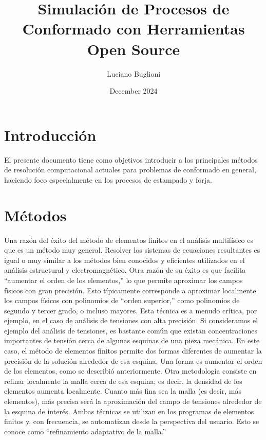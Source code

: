 \documentclass{article}
\title{Simulación de Procesos de Conformado con Herramientas Open Source}
\author{Luciano Buglioni}
\date{December 2024}
\begin{document}
\maketitle
\tableofcontents
\newpage
\section{Introducción}
El presente documento tiene como objetivos introducir a los principales métodos de resolución computacional actuales para problemas de conformado en general, haciendo foco especialmente en los procesos de estampado y forja.




\section{Métodos}

Una razón del éxito del método de elementos finitos en el análisis multifísico es que es un método muy general. Resolver los sistemas de ecuaciones resultantes es igual o muy similar a los métodos bien conocidos y eficientes utilizados en el análisis estructural y electromagnético. Otra razón de su éxito es que facilita “aumentar el orden de los elementos,” lo que permite aproximar los campos físicos con gran precisión. Esto típicamente corresponde a aproximar localmente los campos físicos con polinomios de “orden superior,” como polinomios de segundo y tercer grado, o incluso mayores. Esta técnica es a menudo crítica, por ejemplo, en el caso de análisis de tensiones con alta precisión.
Si consideramos el ejemplo del análisis de tensiones, es bastante común que existan concentraciones importantes de tensión cerca de algunas esquinas de una pieza mecánica. En este caso, el método de elementos finitos permite dos formas diferentes de aumentar la precisión de la solución alrededor de esa esquina. Una forma es aumentar el orden de los elementos, como se describió anteriormente. Otra metodología consiste en refinar localmente la malla cerca de esa esquina; es decir, la densidad de los elementos aumenta localmente. Cuanto más fina sea la malla (es decir, más elementos), más precisa será la aproximación del campo de tensiones alrededor de la esquina de interés. Ambas técnicas se utilizan en los programas de elementos finitos y, con frecuencia, se automatizan desde la perspectiva del usuario. Esto se conoce como “refinamiento adaptativo de la malla.”
\end{document}
